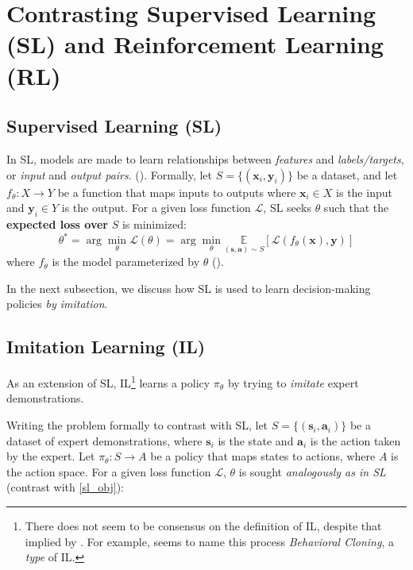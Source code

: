 \documentclass{article} %
\begin{document}
\section{Contrasting Supervised Learning (SL) and Reinforcement Learning (RL)}
\subsection{Supervised Learning (SL)}

In SL, models are made to learn relationships between \textit{features} and \textit{labels/targets}, 
or \textit{input} and \textit{output pairs}. (\cite{Goodfellow-et-al-2016}). 
Formally, let $S = \{(\mathbf{x}_i, \mathbf{y}_i)\}$ be a dataset, 
and let $f_\theta: X \to Y$ be a function that maps inputs to outputs
where $\mathbf{x}_i \in X$ is the input and $\mathbf{y}_i \in Y$ is the output.
For a given loss function $\mathcal{L}$, SL seeks $\theta$ 
such that the \textbf{expected loss over} $S$ is minimized:
\begin{equation} \label{sl_obj}
    \theta^* = \arg\min_\theta \mathcal{L}(\theta) = \arg\min_\theta \underset{(\mathbf{s}, \mathbf{a}) \sim S}{\mathbb{E}}[\mathcal{L}(f_\theta(\mathbf{x}), \mathbf{y})]
\end{equation}
where $f_\theta$ is the model parameterized by $\theta$ (\cite{Levine-et-al-2023}).

In the next subsection, we discuss how SL is used to learn decision-making policies \textit{by imitation}.

\subsection{Imitation Learning (IL)}

As an extension of SL, IL\footnote{There does not seem to be consensus on the definition of IL, despite that implied by \cite{Levine-et-al-2023}. For example, \cite{Underactuated-2023} seems to name this process \textit{Behavioral Cloning}, a \textit{type} of IL.} 
learns a policy $\pi_\theta$ by trying to \textit{imitate} expert demonstrations.

Writing the problem formally to contrast with SL,
let $S = \{(\mathbf{s}_i, \mathbf{a}_i)\}$ be a dataset of expert demonstrations, 
where $\mathbf{s}_i$ is the state and $\mathbf{a}_i$ is the action taken by the expert.
Let $\pi_\theta: S \to A$ be a policy that maps states to actions, where $A$ is the action space. 
For a given loss function $\mathcal{L}$, $\theta$ is sought \textit{analogously as in SL}
(contrast with \ref{sl_obj}):
\end{document}

